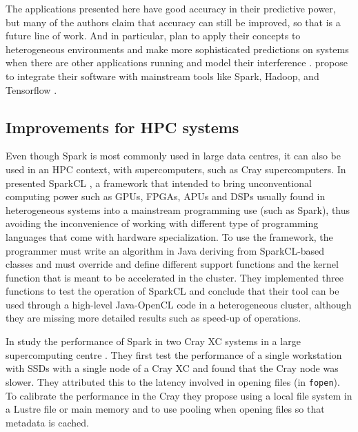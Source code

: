 \documentclass{article}
\begin{document}
The applications presented here have good accuracy in their predictive power, but many of the authors claim that accuracy can still be improved, so that is a future line of work. And in particular, \citeauthor{BrandonHernandez2017} plan to apply their concepts to heterogeneous environments and make more sophisticated predictions on systems when there are other applications running and model their interference \cite{BrandonHernandez2017}. \citeauthor{Ulanov2017} propose to integrate their software with mainstream tools like Spark, Hadoop, and Tensorflow \cite{Ulanov2017}.

\subsection{Improvements for HPC systems}

Even though Spark is most commonly used in large data centres, it can also be used in an HPC context, with supercomputers, such as Cray supercomputers. In \citeyear{Segal2015} \citeauthor{Segal2015} presented SparkCL \cite{Segal2015}, a framework that intended to bring unconventional computing power such as GPUs, FPGAs, APUs and DSPs usually found in heterogeneous systems into a mainstream programming use (such as Spark), thus avoiding the inconvenience of working with different type of programming languages that come with hardware specialization. To use the framework, the programmer must write an algorithm in Java deriving from SparkCL-based classes and must override and define different support functions and the kernel function that is meant to be accelerated in the cluster. They implemented three functions to test the operation of SparkCL and conclude that their tool can be used through a high-level Java-OpenCL code in a heterogeneous cluster, although they are missing more detailed results such as speed-up of operations.

In \citeyear{Chaimov2016} \citeauthor{Chaimov2016} study the performance of Spark in two Cray XC systems in a large supercomputing centre \cite{Chaimov2016}. They first test the performance of a single workstation with SSDs with a single node of a Cray XC and found that the Cray node was slower. They attributed this to the latency involved in opening files (in \texttt{fopen}). To calibrate the performance in the Cray they propose using a local file system in a Lustre file or main memory and to use pooling when opening files so that metadata is cached.
\end{document}
